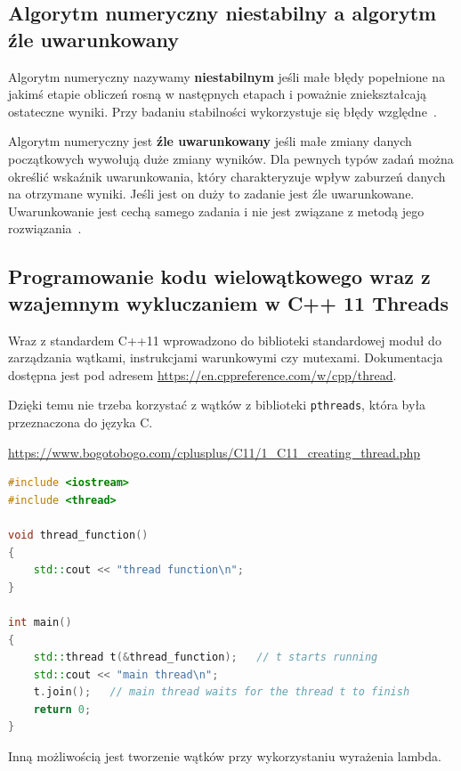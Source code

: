 \documentclass[wi]{zut}
\begin{document}
\subsection{Algorytm numeryczny niestabilny a algorytm źle uwarunkowany}

Algorytm numeryczny nazywamy \textbf{niestabilnym} jeśli małe błędy popełnione na jakimś etapie obliczeń rosną w następnych etapach i poważnie zniekształcają ostateczne wyniki. Przy badaniu stabilności wykorzystuje się błędy względne~\cite{Piela_Wstep}.

Algorytm numeryczny jest \textbf{źle uwarunkowany} jeśli małe zmiany danych początkowych wywołują duże zmiany wyników. Dla pewnych typów zadań można określić wskaźnik uwarunkowania, który charakteryzuje wpływ zaburzeń danych na otrzymane wyniki. Jeśli jest on duży to zadanie jest źle uwarunkowane. Uwarunkowanie jest cechą samego zadania i nie jest związane z metodą jego rozwiązania~\cite{Piela_Wstep}.

\subsection{Programowanie kodu wielowątkowego wraz z wzajemnym wykluczaniem w C++ 11 Threads}

Wraz z standardem C++11 wprowadzono do biblioteki standardowej moduł do zarządzania wątkami, instrukcjami warunkowymi czy mutexami. Dokumentacja dostępna jest pod adresem \url{https://en.cppreference.com/w/cpp/thread}.

Dzięki temu nie trzeba korzystać z wątków z biblioteki \lstinline{pthreads}, która była przeznaczona do języka C.

{\url{https://www.bogotobogo.com/cplusplus/C11/1_C11_creating_thread.php}}{\label{kod:przyklad}}
\begin{lstlisting}[language=C++]
#include <iostream>
#include <thread>

void thread_function()
{
    std::cout << "thread function\n";
}

int main()
{
    std::thread t(&thread_function);   // t starts running
    std::cout << "main thread\n";
    t.join();   // main thread waits for the thread t to finish
    return 0;
}
\end{lstlisting}

Inną możliwością jest tworzenie wątków przy wykorzystaniu wyrażenia lambda.
\end{document}
